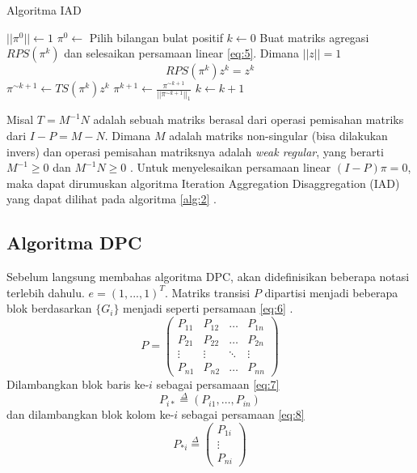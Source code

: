 \begin{breakablealgorithm}
	\label{alg:2}
	\caption{Algoritma IAD \citep{zhuetal2005distributedPagerank}}
	\begin{algorithmic}[1]
		\State $||\pi^0|| \gets 1$
		\State $\pi^0 \gets$ Pilih bilangan bulat positif
		\State $k \gets 0$
		\Do
			\State Buat matriks agregasi $RPS(\pi^k)$ dan selesaikan persamaan linear \ref{eq:5}. Dimana $||z|| = 1$
			\begin{equation}
				\label{eq:5}
				RPS(\pi^k)z^k = z^k
			\end{equation}
			\State $\pi^{\sim k+1} \gets TS(\pi^k)z^k$
			\State $\pi^{k+1} \gets \frac{\pi^{\sim k+1}}{||\pi^{\sim k+1}||_1}$
			\State $k \gets k + 1$
	\end{algorithmic}
\end{breakablealgorithm}

Misal $T = M^{-1}N$ adalah sebuah matriks berasal dari operasi pemisahan matriks dari $I - P = M - N$. Dimana $M$ adalah matriks non-singular (bisa dilakukan invers) dan operasi pemisahan matriksnya adalah \textit{weak regular}, yang berarti $M^{-1} \geq 0$ dan $M^{-1}N \geq 0$ \citep{mishra2016}. Untuk menyelesaikan persamaan linear $(I - P)\pi = 0$, maka dapat dirumuskan algoritma Iteration Aggregation Disaggregation (IAD) yang dapat dilihat pada algoritma \ref{alg:2} \citep{zhuetal2005distributedPagerank}.

\subsection{Algoritma DPC}

Sebelum langsung membahas algoritma DPC, akan didefinisikan beberapa notasi terlebih dahulu. $e=(1,...,1)^T$. Matriks transisi $P$ dipartisi menjadi beberapa blok berdasarkan $\{G_i\}$ menjadi seperti persamaan \ref{eq:6} \citep{zhuetal2005distributedPagerank}.
\begin{equation}
\label{eq:6}
	P =
	\begin{pmatrix}
		P_{11} & P_{12} & \ldots & P_{1n} \\
		P_{21} & P_{22} & \ldots & P_{2n} \\
		\vdots & \vdots & \ddots & \vdots \\
		P_{n1} & P_{n2} & \ldots & P_{nn}
	\end{pmatrix}
\end{equation}
Dilambangkan blok baris ke-$i$ sebagai persamaan \ref{eq:7}
\begin{equation}
\label{eq:7}
	P_{i*} \overset{\Delta}{=} (P_{i1},\ldots,P_{in})
\end{equation}
dan dilambangkan blok kolom ke-$i$ sebagai persamaan \ref{eq:8}
\begin{equation}
\label{eq:8}
	P_{*i} \overset{\Delta}{=}
	\begin{pmatrix}
		P_{1i} \\
		\vdots \\
		P_{ni} 
	\end{pmatrix}
\end{equation} 


